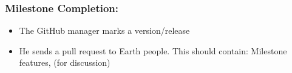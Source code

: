 \documentclass{article}
\begin{document}
\subsubsection{Milestone Completion:}
\begin{itemize}	
\item The GitHub manager marks a version/release 
\item He sends a pull request to Earth people. This should contain: Milestone features, (for discussion)
\end{itemize}
\end{document}
